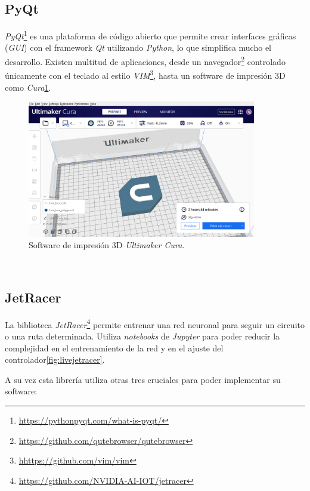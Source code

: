 \subsection{PyQt}
\textit{PyQt}\footnote{\url{https://pythonpyqt.com/what-is-pyqt/}} es una plataforma de código abierto que permite crear interfaces gráficas (\textit{GUI}) con el framework \textit{Qt} utilizando \textit{Python}, lo que simplifica mucho el desarrollo. Existen multitud de aplicaciones, desde un navegador\footnote{\url{https://github.com/qutebrowser/qutebrowser}} controlado únicamente con el teclado al estilo \textit{VIM}\footnote{\url{hhttps://github.com/vim/vim}}, hasta un software de impresión 3D como \textit{Cura}\ref{fig:cura}.\\

\begin{figure} [h!]
	\begin{center}
		\includegraphics[width=10cm]{figs/cura}
	\end{center}
	\caption{Software de impresión 3D \textit{Ultimaker Cura}.}
	\label{fig:cura}
\end{figure}\

\subsection{JetRacer}
\label{subsection:jetracer}
La biblioteca \textit{JetRacer}\footnote{\url{https://github.com/NVIDIA-AI-IOT/jetracer}} permite entrenar una red neuronal para seguir un circuito o una ruta determinada. Utiliza \textit{notebooks} de \textit{Jupyter} para poder reducir la complejidad en el entrenamiento de la red y en el ajuste del controlador\ref{fig:livejetracer}.

A su vez esta librería utiliza otras tres cruciales para poder implementar su software:

